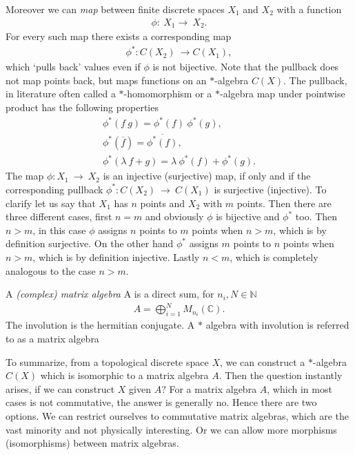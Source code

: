 Moreover we can \textit{map} between finite discrete spaces $X_1$ and $X_2$ with a
function
\begin{align}
    \phi:\ X_1 \rightarrow\ X_2.
\end{align}
For every such map there exists a corresponding map
\begin{align}
    \phi ^*:C(X_2)\ \rightarrow C(X_1),
\end{align}
which `pulls back' values even if $\phi$ is not bijective.
Note that the pullback does not map points back, but maps functions on an $*$-algebra $C(X)$.
The pullback, in literature often called a $*$-homomorphism or a $*$-algebra map under
pointwise product has the following properties
\begin{align}
     \phi ^*(f\ g) = \phi ^*(f)\ \phi ^*(g),\\
     \phi ^*(\overline{f}) = \overline{\phi ^*(f)},\\
     \phi ^*(\lambda\ f + g) = \lambda\ \phi ^*(f) + \phi ^*(g).
\end{align}
    The map $\phi :X_1\ \rightarrow \ X_2$ is an injective (surjective) map,
    if only and if the corresponding pullback $\phi ^* :C(X_2)\ \rightarrow \
    C(X_1)$ is surjective (injective). To clarify let us say that $X_1$ has $n$ points and
    $X_2$ with $m$ points. Then there are three different cases, first $n=m$ and
    obviously $\phi$ is bijective and $\phi ^*$ too. Then $n >  m$, in this case
    $\phi$ assigns $n$ points to $m$ points when $n >  m$, which is by definition
    surjective. On the other hand $\phi ^*$ assigns $m$ points to $n$ points when
    $n >  m$, which is by definition injective. Lastly $n < m $, which is
    completely analogous to the case $n > m$.

\begin{mydefinition}
    A \textit{(complex) matrix algebra} A is a direct sum, for $n_i, N \in
    \mathbb{N}$
    \begin{align}
        A = \bigoplus _{i=1}^{N} M_{n_i}(\mathbb{C}).
    \end{align}
    The involution is the hermitian conjugate. A $*$ algebra with involution is referred to as
    a matrix algebra
\end{mydefinition}

To summarize, from a topological discrete space $X$, we can construct a
$*$-algebra $C(X)$ which is isomorphic to a matrix algebra $A$. Then the
question instantly arises, if we can construct $X$ given $A$? For a matrix
algebra $A$, which in most cases is not commutative, the answer is generally
no. Hence there are two options. We can restrict ourselves to commutative
matrix algebras, which are the vast minority and not physically interesting.
Or we can allow more morphisms (isomorphisms) between matrix algebras.

